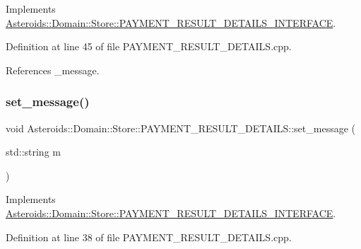 Implements \hyperlink{classAsteroids_1_1Domain_1_1Store_1_1PAYMENT__RESULT__DETAILS__INTERFACE_a2e8cac0ecf2e5b03781c82061006fcb5}{Asteroids\+::\+Domain\+::\+Store\+::\+P\+A\+Y\+M\+E\+N\+T\+\_\+\+R\+E\+S\+U\+L\+T\+\_\+\+D\+E\+T\+A\+I\+L\+S\+\_\+\+I\+N\+T\+E\+R\+F\+A\+CE}.



Definition at line 45 of file P\+A\+Y\+M\+E\+N\+T\+\_\+\+R\+E\+S\+U\+L\+T\+\_\+\+D\+E\+T\+A\+I\+L\+S.\+cpp.



References \+\_\+message.

\mbox{\label{classAsteroids_1_1Domain_1_1Store_1_1PAYMENT__RESULT__DETAILS_a8f093b422a738eb757dc033571ac6352}} 
\subsubsection{\texorpdfstring{set\+\_\+message()}{set\_message()}}
{\footnotesize\ttfamily void Asteroids\+::\+Domain\+::\+Store\+::\+P\+A\+Y\+M\+E\+N\+T\+\_\+\+R\+E\+S\+U\+L\+T\+\_\+\+D\+E\+T\+A\+I\+L\+S\+::set\+\_\+message (\begin{DoxyParamCaption}\item[{std\+::string}]{m }\end{DoxyParamCaption})\hspace{0.3cm}{\ttfamily [virtual]}}



Implements \hyperlink{classAsteroids_1_1Domain_1_1Store_1_1PAYMENT__RESULT__DETAILS__INTERFACE_a5aec143349a38f2c7a964eec84877877}{Asteroids\+::\+Domain\+::\+Store\+::\+P\+A\+Y\+M\+E\+N\+T\+\_\+\+R\+E\+S\+U\+L\+T\+\_\+\+D\+E\+T\+A\+I\+L\+S\+\_\+\+I\+N\+T\+E\+R\+F\+A\+CE}.



Definition at line 38 of file P\+A\+Y\+M\+E\+N\+T\+\_\+\+R\+E\+S\+U\+L\+T\+\_\+\+D\+E\+T\+A\+I\+L\+S.\+cpp.



